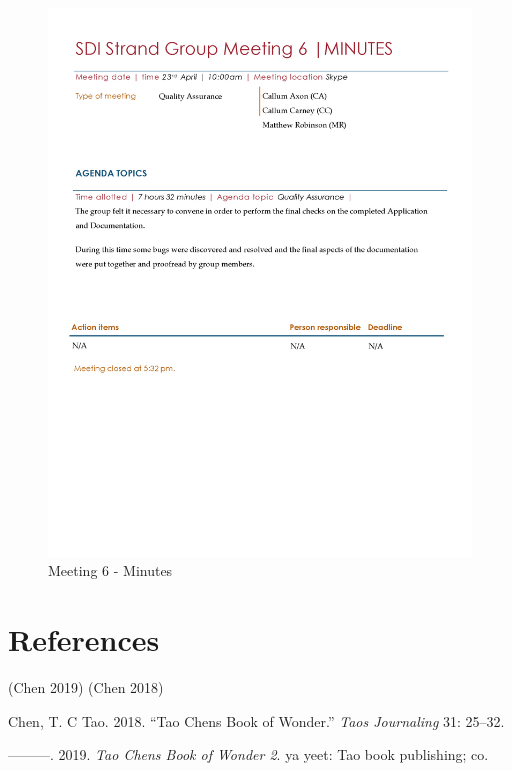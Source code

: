 \documentclass[
  english,
  a4paper,
,tablecaptionabove
]{scrartcl}
\begin{document}
\begin{figure}
\centering
\includegraphics{images/meeting-minutes/meeting-6.png}
\caption{Meeting 6 - Minutes}
\end{figure}

\hypertarget{references}{%
\section{References}\label{references}}

(Chen 2019) (Chen 2018)

\hypertarget{refs}{}
\leavevmode\hypertarget{ref-tao2018}{}%
Chen, T. C Tao. 2018. ``Tao Chens Book of Wonder.'' \emph{Taos
Journaling} 31: 25--32.

\leavevmode\hypertarget{ref-tao2019}{}%
---------. 2019. \emph{Tao Chens Book of Wonder 2}. ya yeet: Tao book
publishing; co.
\end{document}
